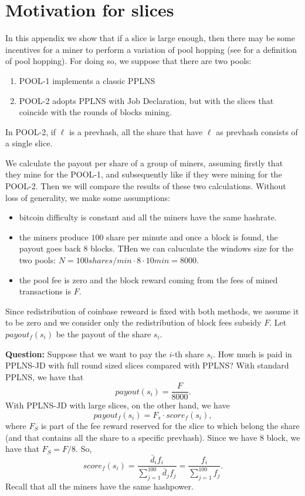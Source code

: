 \documentclass[11pt]{article} %
\begin{document}
\section{Motivation for slices}
In this appendix we show that if a slice is large enough, then there may be some incentives for a miner to perform a variation of pool hopping (see \cite{rosenfeld} for a definition of pool hopping). For doing so, we suppose that there are two pools:
\begin{enumerate}
	\item POOL-1 implements a classic PPLNS
	\item POOL-2 adopts PPLNS with Job Declaration, but with the slices that coincide with the rounds of blocks mining. 
\end{enumerate}
In POOL-2, if $\ell$ is a prevhash, all the share that have $\ell$ as prevhash consists of a single slice.

We calculate the payout per share of a group of miners, assuming firstly that they mine for the POOL-1, and subsequently like if they were mining for the POOL-2. Then we will compare the results of these two calculations. Without loss of generality, we make some assumptions:
\begin{itemize}
	\item bitcoin difficulty is constant and all the miners have the same hashrate.
	\item the miners produce $100$ share per minute and once a block is found, the payout goes back $8$ blocks. THen we can caluculate the windows size for the two pools: $N = 100 shares/min \cdot 8 \cdot 10min = 8000$.
	\item the pool fee is zero and the block reward coming from the fees of mined transactions is $F$. 
	
\end{itemize}
Since redistribution of coinbase reweard is fixed with both methods, we assume it to be zero and we consider only the redistribution of block fees subsidy $F$.
Let $payout_f(s_i)$ be the payout of the share $s_i$.

\textbf{Question:} Suppose that we want to pay the $i$-th share $s_i$. How much is paid in PPLNS-JD with full round sized slices compared with PPLNS?
With standard PPLNS, we have that
\[payout(s_i) = \frac{F}{8000}.\]
With PPLNS-JD with large slices, on the other hand, we have
\[payout_f(s_i) = F_s\cdot score_f(s_i),\]
where $F_S$ is part of the fee reward reserved for the slice to which belong the share (and that contains all the share to a specific prevhash). Since we have $8$ block, we have that $F_S = F/8$. So,
\[score_f(s_i) = \frac{\bar d_i f_i}{\sum_{j=1}^{100} \bar d_j f_j}= \frac{ f_i}{\sum_{j=1}^{100} f_j}. \]
Recall that all the miners have the same hashpower.
\end{document}
